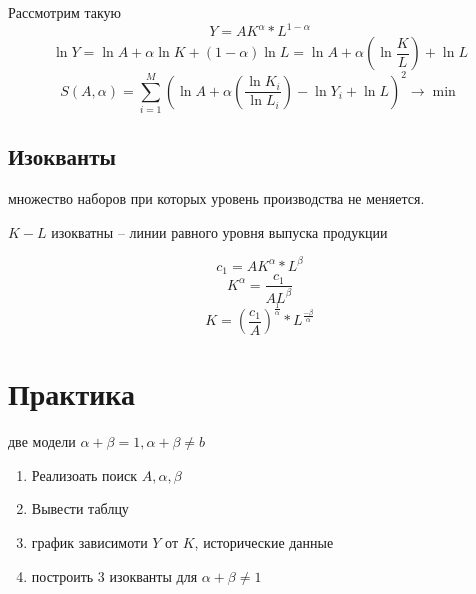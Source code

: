 \documentclass[14pt]{extarticle}
\begin{document}
Рассмотрим такую 
\begin{equation}
Y = A K^{\alpha} * L^{1 - \alpha}
\end{equation} 
\begin{equation}
	\ln Y = \ln{A} + \alpha \ln{K} +(1-\alpha) \ln{L} =
	\ln A + \alpha (\ln \frac{K}{L}) + \ln{L}
\end{equation} 
\begin{equation}
S(A,\alpha) = 
\sum_{i = 1}^{M} (\ln A + \alpha \left(\frac{\ln K_{i}}{\ln L_{i}}\right)- \ln Y_{i} + \ln L)^2 \to \min
\end{equation} 
\subsection{Изокванты}
множество наборов при которых уровень производства не меняется.

$K-L$ изокватны -- линии равного уровня выпуска продукции

\begin{equation}
c_1 = A K^{\alpha} * L^{\beta}
\end{equation} 
\begin{equation}
K^{\alpha} = \frac{c_1}{A L^{\beta}}
\end{equation} 
\begin{equation}
K = \left(\frac{c_1}{A}\right)^{\frac{1}{\alpha}} * L^{\frac{- \beta}{\alpha}}
\end{equation} 
\section{Практика}
две модели $\alpha + \beta = 1, \alpha +\beta \neq b$
\begin{enumerate}
	\item Реализоать поиск $A,\alpha,\beta$ 
	\item  Вывести таблцу
	\item график зависимоти $Y$ от  $K$, исторические данные
	\item построить 3 изокванты для  $\alpha + \beta \neq 1$
\end{enumerate}
\end{document}
